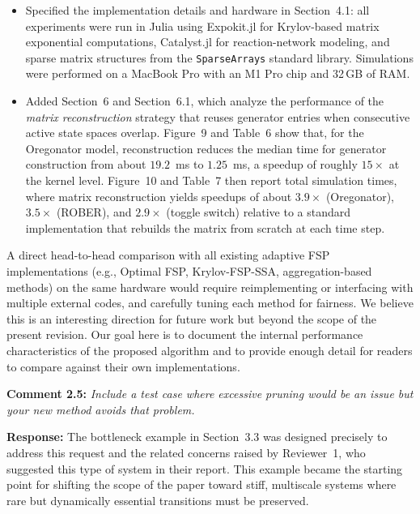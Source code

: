 \documentclass[11pt]{article}
\begin{document}
\begin{itemize}
    \item Specified the implementation details and hardware in Section~4.1: all
        experiments were run in Julia using Expokit.jl for Krylov-based matrix
        exponential computations, Catalyst.jl for reaction-network modeling, and
        sparse matrix structures from the \texttt{SparseArrays} standard library.
        Simulations were performed on a MacBook Pro with an M1 Pro chip and
        32\,GB of RAM.
  \item Added Section~6 and Section~6.1, which analyze the performance of the
        \emph{matrix reconstruction} strategy that reuses generator entries when
        consecutive active state spaces overlap. Figure~9 and Table~6 show that,
        for the Oregonator model, reconstruction reduces the median time for
        generator construction from about $19.2$~ms to $1.25$~ms, a speedup of
        roughly $15\times$ at the kernel level. Figure~10 and Table~7 then report
        total simulation times, where matrix reconstruction yields speedups of
        about $3.9\times$ (Oregonator), $3.5\times$ (ROBER), and $2.9\times$
        (toggle switch) relative to a standard implementation that rebuilds the
        matrix from scratch at each time step.
\end{itemize}

A direct head-to-head comparison with all existing adaptive FSP implementations
(e.g., Optimal FSP, Krylov-FSP-SSA, aggregation-based methods) on the same
hardware would require reimplementing or interfacing with multiple external codes,
and carefully tuning each method for fairness. We believe this is an interesting
direction for future work but beyond the scope of the present revision. Our goal
here is to document the internal performance characteristics of the proposed
algorithm and to provide enough detail for readers to compare against their own
implementations.

\vspace{0.5em}

\noindent\textbf{Comment 2.5:} \textit{Include a test case where excessive pruning would be an issue but
your new method avoids that problem.}

\textbf{Response:} The bottleneck example in Section~3.3 was designed precisely to
address this request and the related concerns raised by Reviewer~1, who suggested
this type of system in their report. This example became the starting point for
shifting the scope of the paper toward stiff, multiscale systems where rare but
dynamically essential transitions must be preserved.
\end{document}
